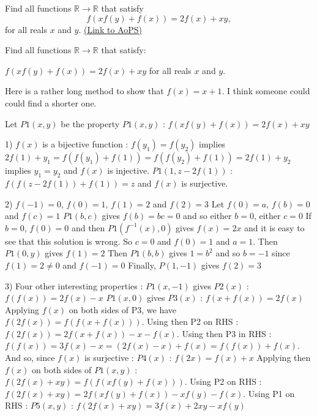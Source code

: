 \begin{problem}
	Find all functions $ \mathbb{R}\to\mathbb{R}$ that satisfy
\[f(xf(y)+f(x))=2f(x)+xy,\]
for all reals $ x$  and $y$.
	\flushright \href{https://artofproblemsolving.com/community/c6h167659}{(Link to AoPS)}
\end{problem}



\begin{mysolution}
	\begin{tcolorbox}Find all functions $ \mathbb{R}\to\mathbb{R}$ that satisfy:

$ f(xf(y) + f(x)) = 2f(x) + xy$ for all reals $ x$  and $ y$.\end{tcolorbox}

Here is a rather long method to show that $ f(x)=x+1$. I think someone could could find a shorter one.

Let $ P1(x,y)$ be the property $ P1(x,y)$ : $ f(xf(y) + f(x)) = 2f(x) + xy$ 

1) $ f(x)$ is a bijective function :
$ f(y_1)=f(y_2)$ implies $ 2f(1)+y_1=f(f(y_1)+f(1))=f(f(y_2)+f(1))=2f(1)+y_2$ implies $ y_1=y_2$ and $ f(x)$ is injective.
$ P1(1,z-2f(1))$ : $ f(f(z-2f(1))+f(1))=z$ and $ f(x)$ is surjective.

2) $ f(-1)=0$, $ f(0)=1$, $ f(1)=2$ and $ f(2)=3$
Let $ f(0)=a$, $ f(b)=0$ and $ f(c)=1$
$ P1(b,c)$ gives $ f(b)=bc=0$ and so either $ b=0$, either $ c=0$
If $ b=0$, $ f(0)=0$ and then $ P1(f^{-1}(x),0)$ gives $ f(x)=2x$ and it is easy to see that this solution is wrong. So $ c=0$ and $ f(0)=1$ and $ a=1$.
Then $ P1(0,y)$ gives $ f(1)=2$
Then $ P1(b,b)$ gives $ 1=b^2$ and so $ b=-1$ since $ f(1)=2\neq 0$ and $ f(-1)=0$
Finally, $ P(1,-1)$ gives $ f(2)=3$

3) Four other interesting properties :
$ P1(x,-1)$ gives $ P2(x)$ : $ f(f(x))=2f(x)-x$
$ P1(x,0)$ gives $ P3(x)$ : $ f(x+f(x))=2f(x)$
Applying $ f(x)$ on both sides of P3, we have $ f(2f(x))=f(f(x+f(x)))$. Using then P2 on RHS : $ f(2f(x))=2f(x+f(x))-x-f(x)$. Using then P3 in RHS : $ f(f(x))=3f(x)-x=(2f(x)-x)+f(x)=f(f(x))+f(x)$. And so, since $ f(x)$ is surjective :
$ P4(x)$ : $ f(2x)=f(x)+x$
Applying then $ f(x)$ on both sides of $ P1(x,y)$ : $ f(2f(x)+xy)=f(f(xf(y)+f(x)))$. Using P2 on RHS : $ f(2f(x)+xy)=2f(xf(y)+f(x))-xf(y)-f(x)$. Using P1 on RHS : 
$ P5(x,y)$ : $ f(2f(x)+xy)=3f(x)+2xy-xf(y)$


\end{mysolution}
